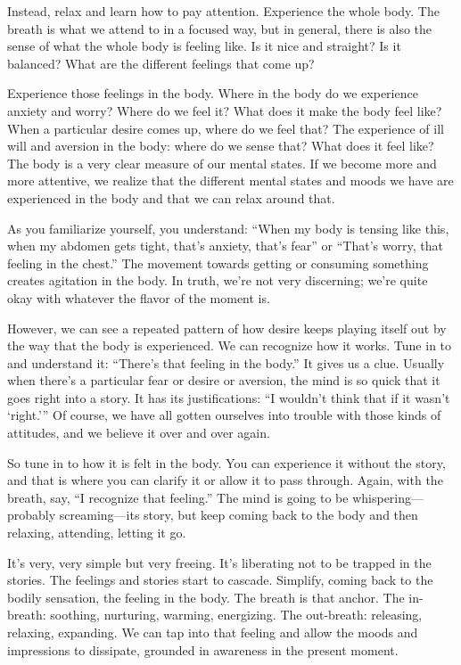Instead, relax and learn how to pay attention. Experience the whole
body. The breath is what we attend to in a focused way, but in general,
there is also the sense of what the whole body is feeling like. Is it
nice and straight? Is it balanced? What are the different feelings that
come up?

Experience those feelings in the body. Where in the body do we
experience anxiety and worry? Where do we feel it? What does it make the
body feel like? When a particular desire comes up, where do we feel
that? The experience of ill will and aversion in the body: where do we
sense that? What does it feel like? The body is a very clear measure of
our mental states. If we become more and more attentive, we realize that
the different mental states and moods we have are experienced in the
body and that we can relax around that.

As you familiarize yourself, you understand: “When my body is tensing
like this, when my abdomen gets tight, that’s anxiety, that’s fear” or
“That’s worry, that feeling in the chest.” The movement towards getting
or consuming something creates agitation in the body. In truth, we’re
not very discerning; we’re quite okay with whatever the flavor of the
moment is.

However, we can see a repeated pattern of how desire keeps playing
itself out by the way that the body is experienced. We can recognize how
it works. Tune in to and understand it: “There’s that feeling in the
body.” It gives us a clue. Usually when there’s a particular fear or
desire or aversion, the mind is so quick that it goes right into a
story. It has its justifications: “I wouldn’t think that if it wasn’t
‘right.’” Of course, we have all gotten ourselves into trouble with
those kinds of attitudes, and we believe it over and over again.

So tune in to how it is felt in the body. You can experience it without
the story, and that is where you can clarify it or allow it to pass
through. Again, with the breath, say, “I recognize that feeling.” The
mind is going to be whispering—probably screaming—its story, but keep
coming back to the body and then relaxing, attending, letting it go.

It’s very, very simple but very freeing. It’s liberating not to be
trapped in the stories. The feelings and stories start to cascade.
Simplify, coming back to the bodily sensation, the feeling in the body.
The breath is that anchor. The in-breath: soothing, nurturing, warming,
energizing. The out-breath: releasing, relaxing, expanding. We can tap
into that feeling and allow the moods and impressions to dissipate,
grounded in awareness in the present moment.


